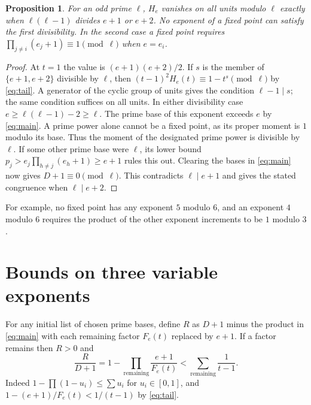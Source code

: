 \documentclass[11pt]{article}
\newtheorem{proposition}[theorem]{Proposition}
\begin{document}
\begin{proposition}\label{prop:local}
For an odd prime $\ell$, $H_e$ vanishes on all units modulo $\ell$
exactly when $\ell(\ell-1)$ divides $e+1$ or $e+2$. No exponent of a
fixed point can satisfy the first divisibility. In the second case a
fixed point requires $\prod_{j\ne i}(e_j+1)\equiv1\pmod\ell$ when
$e=e_i$.
\end{proposition}
\begin{proof}
At $t=1$ the value is $(e+1)(e+2)/2$. If $s$ is the member of
$\{e+1,e+2\}$ divisible by $\ell$, then
$(t-1)^2 H_e(t)\equiv1-t^s\pmod\ell$ by \eqref{eq:tail}.
A generator of the cyclic group of units gives the condition
$\ell-1\mid s$; the same condition suffices on all units.
In either divisibility case $e\ge\ell(\ell-1)-2\ge\ell$.
The prime base of this exponent exceeds $e$ by \eqref{eq:main}.
A prime power alone cannot be a fixed point, as its proper moment
is $1$ modulo its base.
Thus the moment of the designated prime power is divisible by $\ell$.
If some other prime base were $\ell$, its lower bound
$p_j>e_j\prod_{h\ne j}(e_h+1)\ge e+1$ rules this out.
Clearing the bases in \eqref{eq:main} now gives $D+1\equiv0\pmod\ell$.
This contradicts $\ell\mid e+1$ and gives the stated congruence when
$\ell\mid e+2$.
\end{proof}

For example, no fixed point has any exponent $5$ modulo $6$, and an
exponent $4$ modulo $6$ requires the product of the other
exponent increments to be $1$ modulo $3$.

\section{Bounds on three variable exponents}
For any initial list of chosen prime bases, define $R$ as $D+1$ minus
the product in \eqref{eq:main} with each remaining factor $F_e(t)$
replaced by $e+1$. If a factor remains then $R>0$ and
\begin{equation}
 \frac{R}{D+1}=1-\prod_{\mathrm{remaining}}\frac{e+1}{F_e(t)}
 <\sum_{\mathrm{remaining}}\frac1{t-1}.\label{eq:res}
\end{equation}
Indeed $1-\prod(1-u_i)\le\sum u_i$ for $u_i\in[0,1]$, and
$1-(e+1)/F_e(t)<1/(t-1)$ by \eqref{eq:tail}.
\end{document}
